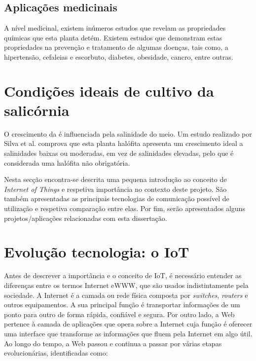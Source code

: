 

\subsection{Aplicações medicinais}


A nível medicinal, existem inúmeros estudos que revelam as propriedades químicas que esta planta detém. Existem estudos que demonstram estas propriedades na prevenção e tratamento de algumas doenças, tais como, a hipertensão, cefaleias e escorbuto, diabetes, obesidade, cancro, entre outras.


\section{Condições ideais de cultivo da salicórnia}

O crescimento da \sr é influenciada pela salinidade do meio. Um estudo realizado por Silva et al.\cite{Silva2007} comprova que esta planta halófita apresenta um crescimento ideal a salinidades baixas ou moderadas, em vez de salinidades elevadas, pelo que é considerada uma halófita não obrigatória.











Nesta secção encontra-se descrita uma pequena introdução ao conceito de \textit{Internet of Things} e respetiva importância no contexto deste projeto. São também apresentadas as principais tecnologias de comunicação possível de utilização e respetiva comparação entre elas. Por fim, serão apresentados alguns projetos/aplicações relacionadas com esta dissertação.  





\section{Evolução tecnologia: o IoT}


Antes de descrever a importância e o conceito de \ac{IoT}, é necessário entender as diferenças entre os termos Internet e\ac{WWW}, que 	são usados indistintamente pela sociedade. A Internet é a camada ou rede física composta por \textit{switches}, \textit{routers} e outros equipamentos\cite{Evans2011a}. A sua principal função é transportar informações de um ponto para outro de forma rápida, confiável e segura. Por outro lado, a Web pertence à camada de aplicações que opera sobre a Internet cuja função é oferecer uma interface que transforme as informações que fluem pela Internet em algo útil. Ao longo do tempo, a Web passou e continua a passar por várias etapas evolucionárias, identificadas como:

